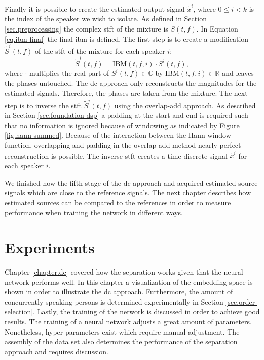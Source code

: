 Finally it is possible to create the estimated output signal $\tilde{x}^i$, where $0 \le i < k$ is the index of the speaker we wish to isolate.
As defined in Section \ref{sec.preprocessing} the complex \gls{stft} of the mixture is $S(t,f)$. In Equation \ref{eq.ibm-final} the final \gls{ibm} is defined.
The first step is to create a modification $\tilde{S}^i(t,f)$ of the \gls{stft} of the mixture for each speaker $i$:
\begin{equation}
	\tilde{S}^i(t,f)=\mathrm{IBM}(t,f,i) \cdot S^i(t,f),
\end{equation}
where $\cdot$ multiplies the real part of $S^i(t,f) \in \mathbb{C}$ by $\mathrm{IBM}(t,f,i) \in \mathbb{R}$ and leaves the phases untouched.
The \gls{dc} approach only reconstructs the magnitudes for the estimated signals. Therefore, the phases are taken from the mixture.
The next step is to inverse the \gls{stft} $\tilde{S}^i(t,f)$ using the overlap-add approach. As described in Section \ref{sec.foundation-dsp} a padding at the start and end is required such that no information is ignored because of windowing as indicated by Figure \ref{fig.hann-summed}.
Because of the interaction between the Hann window function, overlapping and padding in the overlap-add method nearly perfect reconstruction is possible.
The inverse \gls{stft} creates a time discrete signal $\tilde{x}^i$ for each speaker $i$.

We finished now the fifth stage of the \gls{dc} approach and acquired estimated source signals which are close to the reference signals. The next chapter describes how estimated sources can be compared to the references in order to measure performance when training the network in different ways.

\chapter{Experiments}\label{sec.experimental-evaluation}

Chapter \ref{chapter.dc} covered how the separation works given that the neural network performs well. In this chapter a visualization of the embedding space is shown in order to illustrate the \gls{dc} approach. 
Furthermore, the amount of concurrently speaking persons is determined experimentally in Section \ref{sec.order-selection}.
Lastly, the training of the network is discussed in order to achieve good results. The training of a neural network adjusts a great amount of parameters. Nonetheless, hyper-parameters exist which require manual adjustment. The assembly of the data set also determines the performance of the separation approach and requires discussion.

